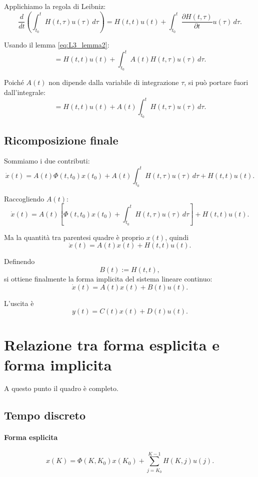 Applichiamo la regola di Leibniz:
\[
\frac{d}{dt}\left(
\int_{t_0}^{t}H(t,\tau)u(\tau)\,d\tau
\right)
=
H(t,t)u(t)+\int_{t_0}^{t}\frac{\partial H(t,\tau)}{\partial t}u(\tau)\,d\tau.
\]

Usando il lemma \eqref{eq:L3_lemma2}:
\[
=
H(t,t)u(t)+\int_{t_0}^{t}A(t)H(t,\tau)u(\tau)\,d\tau.
\]

Poiché $A(t)$ non dipende dalla variabile di integrazione $\tau$, si può portare fuori dall'integrale:
\[
=
H(t,t)u(t)+A(t)\int_{t_0}^{t}H(t,\tau)u(\tau)\,d\tau.
\]

\subsection{Ricomposizione finale}

Sommiamo i due contributi:
\[
\dot x(t)
=
A(t)\Phi(t,t_0)x(t_0)
+
A(t)\int_{t_0}^{t}H(t,\tau)u(\tau)\,d\tau
+
H(t,t)u(t).
\]

Raccogliendo $A(t)$:
\[
\dot x(t)
=
A(t)\left[
\Phi(t,t_0)x(t_0)+\int_{t_0}^{t}H(t,\tau)u(\tau)\,d\tau
\right]
+
H(t,t)u(t).
\]

Ma la quantità tra parentesi quadre è proprio $x(t)$, quindi
\[
\dot x(t)=A(t)x(t)+H(t,t)u(t).
\]

Definendo
\begin{equation}
B(t):=H(t,t),
\label{eq:L3_def_B}
\end{equation}
si ottiene finalmente la forma implicita del sistema lineare continuo:
\begin{equation}
\boxed{
\dot x(t)=A(t)x(t)+B(t)u(t).
}
\label{eq:L3_TC_implicit}
\end{equation}

L'uscita è
\begin{equation}
\boxed{
y(t)=C(t)x(t)+D(t)u(t).
}
\label{eq:L3_TC_output_implicit}
\end{equation}

\section{Relazione tra forma esplicita e forma implicita}

A questo punto il quadro è completo.

\subsection{Tempo discreto}

\paragraph{Forma esplicita}
\[
x(K)=\Phi(K,K_0)x(K_0)+\sum_{j=K_0}^{K-1}H(K,j)u(j).
\]

